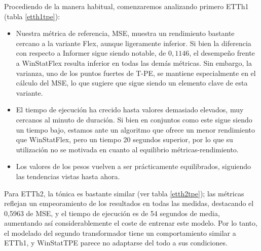  Procediendo de la manera habitual, comenzaremos analizando primero ETTh1 (tabla \ref{etth1tpe}):
 
 \begin{itemize}
 	\item Nuestra métrica de referencia, MSE, muestra un rendimiento bastante cercano a la variante Flex, aunque ligeramente inferior. Si bien la diferencia con respecto a Informer sigue siendo notable, de $0,1146$, el desempeño frente a WinStatFlex resulta inferior en todas las demás métricas. Sin embargo, la varianza, uno de los puntos fuertes de T-PE, se mantiene especialmente en el cálculo del MSE, lo que sugiere que sigue siendo un elemento clave de esta variante.
 	
 	\item El tiempo de ejecución ha crecido hasta valores demasiado elevados, muy cercanos al minuto de duración. Si bien en conjuntos como este sigue siendo un tiempo bajo, estamos ante un algoritmo que ofrece un menor rendimiento que WinStatFlex, pero un tiempo 20 segundos superior, por lo que su utilización no se motivada en cuanto al equilibrio métricas-rendimiento.
 	\item Los valores de los pesos vuelven a ser prácticamente equilibrados, siguiendo las tendencias vistas hasta ahora.
 \end{itemize}
 
 Para ETTh2, la tónica es bastante similar (ver tabla \ref{etth2tpe}); las métricas reflejan un empeoramiento de los resultados en todas las medidas, destacando el 0,5963 de MSE, y el tiempo de ejecución es de 54 segundos de media, aumentando así considerablemente el coste de entrenar este modelo. Por lo tanto, el modelado del segundo transformador tiene un comportamiento similar a ETTh1, y WinStatTPE parece no adaptarse del todo a sus condiciones.
 
